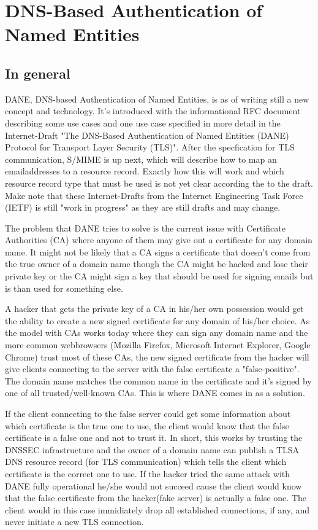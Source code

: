 \section{DNS-Based Authentication of Named Entities} 
\subsection{In general}
DANE, DNS-based Authentication of Named Entities, is as of writing still a new concept and technology.
It's introduced with the informational RFC document\cite{rfc:6394} describing some use cases and one use case specified in more detail in the Internet-Draft "The DNS-Based Authentication of Named Entities (DANE) Protocol for Transport Layer Security (TLS)"\cite{rfc:draft-dane}.
After the specfication for TLS communication, S/MIME is up next, which will describe how to map an emailaddresses to a resource record.
Exactly how this will work and which resource record type that must be used is not yet clear according the to the draft\cite{rfc:draft-smime}.
Make note that these Internet-Drafts from the Internet Engineering Task Force (IETF) is still "work in progress" as they are still drafts and may change.

The problem that DANE tries to solve is the current issue with Certificate Authorities (CA) where anyone of them may give out a certificate for any domain name.
It might not be likely that a CA signs a certificate that doesn't come from the true owner of a domain name though the CA might be hacked and lose their private key or the CA might sign a key that should be used for signing emails but is than used for something else.

A hacker that gets the private key of a CA in his/her own possession would get the ability to create a new signed certificate for any domain of his/her choice.
As the model with CAs works today where they can sign any domain name and the more common webbrowsers (Mozilla Firefox, Microsoft Internet Explorer, Google Chrome) trust most of these CAs, the new signed certificate from the hacker will give clients connecting to the server with the false certificate a "false-positive".
The domain name matches the common name in the certificate and it's signed by one of all trusted/well-known CAs.
This is where DANE comes in as a solution.

If the client connecting to the false server could get some information about which certificate is the true one to use, the client would know that the false certificate is a false one and not to trust it.
In short, this works by trusting the DNSSEC infrastructure and the owner of a domain name can publish a TLSA DNS resource record (for TLS communication) which tells the client which certificate is the correct one to use.
If the hacker tried the same attack with DANE fully operational he/she would not succeed cause the client would know that the false certificate from the hacker(fake server) is actually a false one.
The client would in this case immidiately drop all established connections, if any, and never initiate a new TLS connection.


